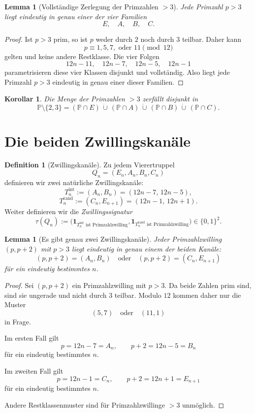 \documentclass[11pt,a4paper]{article}
\newtheorem{lemma}[satz]{Lemma}
\newtheorem{korollar}[satz]{Korollar}
\theoremstyle{definition}
\newtheorem{definition}[satz]{Definition}
\theoremstyle{remark}
\newcommand{\pp}{\mathbb{P}}
\newcommand{\ind}{\mathbf{1}}
\begin{document}
	\begin{lemma}[Vollständige Zerlegung der Primzahlen \(>3\)]
		Jede Primzahl \(p>3\) liegt eindeutig in genau einer der vier Familien
		\[
		E,\quad A,\quad B,\quad C.
		\]
	\end{lemma}
	
	\begin{proof}
		Ist \(p>3\) prim, so ist \(p\) weder durch \(2\) noch durch \(3\) teilbar. Daher kann
		\[
		p \equiv 1,5,7,\text{ oder }11 \pmod{12}
		\]
		gelten und keine andere Restklasse. Die vier Folgen
		\[
		12n-11,\quad 12n-7,\quad 12n-5,\quad 12n-1
		\]
		parametrisieren diese vier Klassen disjunkt und vollständig. Also liegt jede Primzahl \(p>3\)
		eindeutig in genau einer dieser Familien.
	\end{proof}
	
	\begin{korollar}
		Die Menge der Primzahlen \(>3\) zerfällt disjunkt in
		\[
		\pp\setminus\{2,3\}
		=
		(\pp\cap E)\,\dot\cup\,(\pp\cap A)\,\dot\cup\,(\pp\cap B)\,\dot\cup\,(\pp\cap C).
		\]
	\end{korollar}
	
	\section{Die beiden Zwillingskanäle}
	
	\begin{definition}[Zwillingskanäle]
		Zu jedem Vierertruppel
		\[
		Q_n=(E_n,A_n,B_n,C_n)
		\]
		definieren wir zwei natürliche Zwillingskanäle:
		\[
		T_n^{\mathrm{int}}:=(A_n,B_n)=(12n-7,\,12n-5),
		\]
		\[
		T_n^{\mathrm{rand}}:=(C_n,E_{n+1})=(12n-1,\,12n+1).
		\]
		Weiter definieren wir die \emph{Zwillingssignatur}
		\[
		\tau(Q_n)
		:=
		\bigl(
		\ind_{T_n^{\mathrm{int}}\text{ ist Primzahlzwilling}},
		\ind_{T_n^{\mathrm{rand}}\text{ ist Primzahlzwilling}}
		\bigr)
		\in\{0,1\}^2.
		\]
	\end{definition}
	
	\begin{lemma}[Es gibt genau zwei Zwillingskanäle]
		Jeder Primzahlzwilling \((p,p+2)\) mit \(p>3\) liegt eindeutig in genau einem der beiden Kanäle:
		\[
		(p,p+2)=(A_n,B_n)
		\quad\text{oder}\quad
		(p,p+2)=(C_n,E_{n+1})
		\]
		für ein eindeutig bestimmtes \(n\).
	\end{lemma}
	
	\begin{proof}
		Sei \((p,p+2)\) ein Primzahlzwilling mit \(p>3\). Da beide Zahlen prim sind, sind sie ungerade
		und nicht durch \(3\) teilbar. Modulo \(12\) kommen daher nur die Muster
		\[
		(5,7)\quad\text{oder}\quad(11,1)
		\]
		in Frage.
		
		Im ersten Fall gilt
		\[
		p=12n-7=A_n,\qquad p+2=12n-5=B_n
		\]
		für ein eindeutig bestimmtes \(n\).
		
		Im zweiten Fall gilt
		\[
		p=12n-1=C_n,\qquad p+2=12n+1=E_{n+1}
		\]
		für ein eindeutig bestimmtes \(n\).
		
		Andere Restklassenmuster sind für Primzahlzwillinge \(>3\) unmöglich.
	\end{proof}
	
\end{document}
